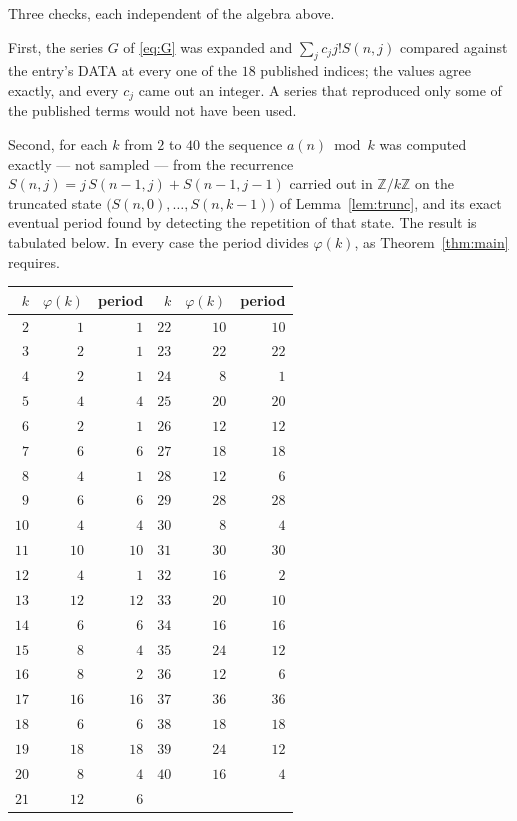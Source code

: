 \documentclass[11pt,a4paper]{article}
\theoremstyle{plain}
\theoremstyle{definition}
\begin{document}
Three checks, each independent of the algebra above.

First, the series $G$ of \eqref{eq:G} was expanded and $\sum_j c_j j! S(n,j)$ compared
against the entry's DATA at every one of the $18$ published indices; the values
agree exactly, and every $c_j$ came out an integer. A series that reproduced only some of
the published terms would not have been used.

Second, for each $k$ from $2$ to $40$ the sequence $a(n)\bmod k$ was computed exactly
--- not sampled --- from the recurrence $S(n,j)=j\,S(n-1,j)+S(n-1,j-1)$ carried out in
$\mathbb{Z}/k\mathbb{Z}$ on the truncated state
$\bigl(S(n,0),\dots,S(n,k-1)\bigr)$ of Lemma~\ref{lem:trunc}, and its exact eventual
period found by detecting the repetition of that state. The result is tabulated below.
In every case the period divides $\varphi(k)$, as Theorem~\ref{thm:main} requires.

\begin{center}\small
\begin{tabular}{rrr@{\qquad\qquad}rrr}
$k$ & $\varphi(k)$ & period & $k$ & $\varphi(k)$ & period \\ \hline
$2$ & $1$ & $1$ & $22$ & $10$ & $10$ \\
$3$ & $2$ & $1$ & $23$ & $22$ & $22$ \\
$4$ & $2$ & $1$ & $24$ & $8$ & $1$ \\
$5$ & $4$ & $4$ & $25$ & $20$ & $20$ \\
$6$ & $2$ & $1$ & $26$ & $12$ & $12$ \\
$7$ & $6$ & $6$ & $27$ & $18$ & $18$ \\
$8$ & $4$ & $1$ & $28$ & $12$ & $6$ \\
$9$ & $6$ & $6$ & $29$ & $28$ & $28$ \\
$10$ & $4$ & $4$ & $30$ & $8$ & $4$ \\
$11$ & $10$ & $10$ & $31$ & $30$ & $30$ \\
$12$ & $4$ & $1$ & $32$ & $16$ & $2$ \\
$13$ & $12$ & $12$ & $33$ & $20$ & $10$ \\
$14$ & $6$ & $6$ & $34$ & $16$ & $16$ \\
$15$ & $8$ & $4$ & $35$ & $24$ & $12$ \\
$16$ & $8$ & $2$ & $36$ & $12$ & $6$ \\
$17$ & $16$ & $16$ & $37$ & $36$ & $36$ \\
$18$ & $6$ & $6$ & $38$ & $18$ & $18$ \\
$19$ & $18$ & $18$ & $39$ & $24$ & $12$ \\
$20$ & $8$ & $4$ & $40$ & $16$ & $4$ \\
$21$ & $12$ & $6$ &  & & \\
\end{tabular}
\end{center}
\end{document}
